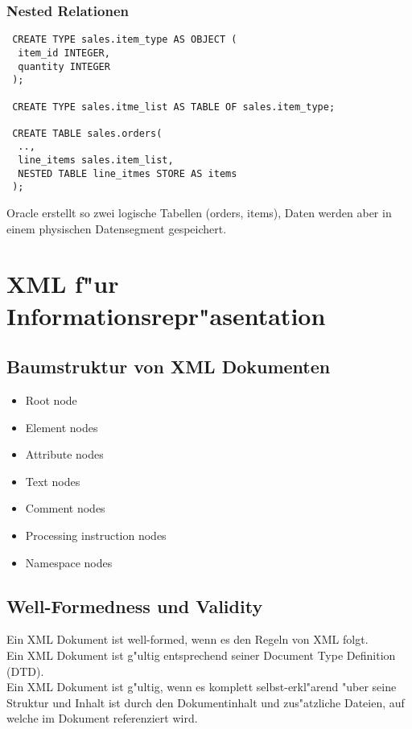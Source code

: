 \documentclass[german, 10pt, a4paper, twocolumn]{scrartcl}
\theoremstyle{definition}
\theoremstyle{remark}
\theoremstyle{example}
\begin{document}
\subsubsection{Nested Relationen}

\small
\begin{verbatim}
 CREATE TYPE sales.item_type AS OBJECT (
  item_id INTEGER,
  quantity INTEGER
 );

 CREATE TYPE sales.itme_list AS TABLE OF sales.item_type;

 CREATE TABLE sales.orders(
  ..,
  line_items sales.item_list,
  NESTED TABLE line_itmes STORE AS items
 );
\end{verbatim}
\normalsize

Oracle erstellt so zwei logische Tabellen (orders, items), Daten werden aber in einem physischen Datensegment gespeichert.

\section{XML f"ur Informationsrepr"asentation}

\subsection{Baumstruktur von XML Dokumenten}

\begin{itemize}
	\item Root node
	\item Element nodes
	\item Attribute nodes
	\item Text nodes
	\item Comment nodes
	\item Processing instruction nodes
	\item Namespace nodes
\end{itemize}

\subsection{Well-Formedness und Validity}

Ein XML Dokument ist well-formed, wenn es den Regeln von XML folgt.\\

Ein XML Dokument ist g"ultig entsprechend seiner Document Type Definition (DTD).\\

Ein XML Dokument ist g"ultig, wenn es komplett selbst-erkl"arend "uber seine Struktur und Inhalt ist durch den Dokumentinhalt und zus"atzliche Dateien, auf welche im Dokument referenziert wird.
\end{document}
